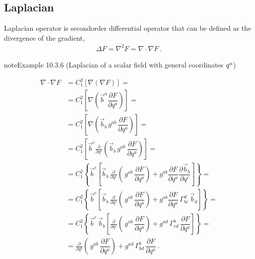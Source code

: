 \documentclass[letterpaper,10pt,english]{jupyterBook}
\begin{document}
\subsection{Laplacian}
\label{\detokenize{ch/tensor-algebra-calculus/calculus-euclidean:laplacian}}\label{\detokenize{ch/tensor-algebra-calculus/calculus-euclidean:tensor-calculus-differential-operators-laplacian}}
\sphinxAtStartPar
Laplacian operator is second\sphinxhyphen{}order differential operator that can be defined as the divergence of the gradient,
\begin{equation*}
\begin{split}\Delta F = \nabla^2 F = \nabla \cdot \nabla F \ .\end{split}
\end{equation*}\label{ch/tensor-algebra-calculus/calculus-euclidean:example-9}
\begin{sphinxadmonition}{note}{Example 10.3.6 (Laplacian of a scalar field \sphinxhyphen{} with general coordinates \protect\(q^a\protect\))}


\begin{equation*}
\begin{split}
\nabla \cdot \nabla F
  & = C_{1}^2 \left[ \nabla \left( \nabla F \right) \right] = \\
  & = C_{1}^2 \left[ \nabla \left( \vec{b}^a \dfrac{\partial F}{\partial q^a} \right) \right] = \\
  & = C_{1}^2 \left[ \nabla \left( \vec{b}_b \, g^{ab} \, \dfrac{\partial F}{\partial q^a} \right) \right] = \\
  & = C_{1}^2 \left[ \vec{b}^c \frac{\partial}{\partial q^c} \left( \vec{b}_b \, g^{ab} \, \dfrac{\partial F}{\partial q^a} \right) \right] = \\
  & = C_{1}^2 \left\{ \vec{b}^c \left[ \vec{b}_b \, \frac{\partial}{\partial q^c} \left( \, g^{ab} \, \dfrac{\partial F}{\partial q^a} \right) + g^{ab} \dfrac{\partial F}{\partial q^a} \dfrac{\partial \vec{b}_b}{\partial q^c} \right] \right\} = \\
  & = C_{1}^2 \left\{ \vec{b}^c \left[ \vec{b}_b \, \frac{\partial}{\partial q^c} \left( \, g^{ab} \, \dfrac{\partial F}{\partial q^a} \right) + g^{ab} \dfrac{\partial F}{\partial q^a} \, \Gamma_{bc}^d \, \vec{b}_d \right] \right \} = \\
  & = C_{1}^2 \left\{ \vec{b}^c \, \vec{b}_b \left[ \frac{\partial}{\partial q^c} \left( \, g^{ab} \, \dfrac{\partial F}{\partial q^a} \right) + g^{ad} \, \Gamma_{cd}^b \, \dfrac{\partial F}{\partial q^a} \right] \right \} = \\
  & = \frac{\partial}{\partial q^b} \left( \, g^{ab} \, \dfrac{\partial F}{\partial q^a} \right) + g^{ad} \, \Gamma_{bd}^b \, \dfrac{\partial F}{\partial q^a} \ .
\end{split}
\end{equation*}\end{sphinxadmonition}
\end{document}
